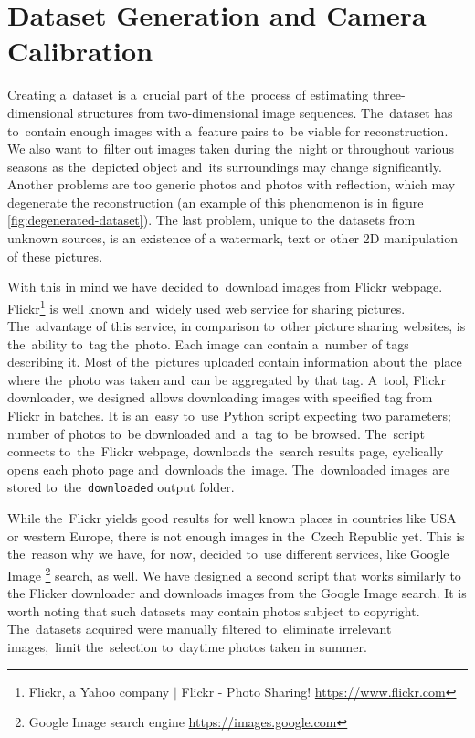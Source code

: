 \section{Dataset Generation and Camera Calibration}
\label{sec:camera_calib}
Creating a~dataset is a~crucial part of the~process of estimating three-dimensional structures from two-dimensional image sequences. The~dataset has to~contain enough images with a~feature pairs to~be viable for reconstruction. We also want to~filter out images taken during the~night or throughout various seasons as the~depicted object and~its surroundings may change significantly. Another problems are too generic photos and photos with reflection, which may degenerate the reconstruction (an example of this phenomenon is in figure \ref{fig:degenerated-dataset}). The last problem, unique to the datasets from unknown sources, is an existence of a watermark, text or other 2D manipulation of these pictures.

With this in mind we have decided to~download images from Flickr webpage. Flickr\footnote{Flickr, a Yahoo company $|$ Flickr - Photo Sharing! \url{https://www.flickr.com}} is well known and~widely used web service for sharing pictures. The~advantage of this service, in comparison to~other picture sharing websites, is the~ability to~tag the~photo. Each image can contain a~number of tags describing it. Most of the~pictures uploaded contain information about the~place where the~photo was taken and~can be aggregated by that tag. A~tool, Flickr downloader, we designed allows downloading images with specified tag from Flickr in batches. It is an~easy to~use Python script expecting two parameters; number of photos to~be downloaded and~a~tag to~be browsed. The~script connects to~the~Flickr webpage, downloads the~search results page, cyclically opens each photo page and~downloads the~image. The~downloaded images are stored to~the~\texttt{downloaded} output folder.

While the~Flickr yields good results for well known places in countries like USA or western Europe, there is not enough images in the~Czech Republic yet. This is the~reason why we have, for now, decided to~use different services, like Google Image \footnote{Google Image search engine \url{https://images.google.com}} search, as well. We have designed a second script that works similarly to the Flicker downloader and downloads images from the Google Image search. It is worth noting that such datasets may contain photos subject to copyright. The~datasets acquired were manually filtered to~eliminate irrelevant images,~limit the~selection to~daytime photos taken in summer.

